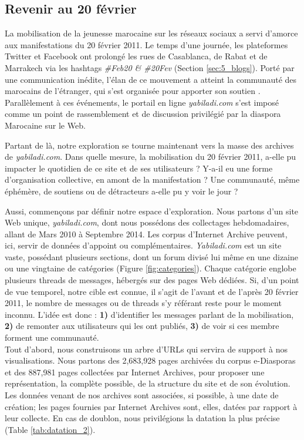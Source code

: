 \documentclass[symmetric,justified,marginals=raggedouter]{tufte-book}
\begin{document}
\subsection{Revenir au 20 février}

\noindent La mobilisation de la jeunesse marocaine sur les réseaux sociaux a servi d'amorce aux manifestations du 20 février 2011. Le temps d'une journée, les plateformes Twitter et Facebook ont prolongé les rues de Casablanca, de Rabat et de Marrakech via les hashtags \textit{\#Feb20 \& \#20Fev} (Section \ref{sec:5_blogs}). Porté par une communication inédite, l'élan de ce mouvement a atteint la communauté des marocains de l'étranger, qui s'est orga\-nisée pour apporter son soutien \citep{desrues_mouvement_2012}. Parallèlement à ces événements, le portail en ligne \textit{yabiladi.com} s'est imposé comme un point de rassemblement et de discussion privilégié par la diaspora Marocaine sur le Web. 

Partant de là, notre exploration se tourne maintenant vers la masse des archives de \textit{yabiladi.com}. Dans quelle mesure, la mobilisation du 20 février 2011, a-elle pu impacter le quotidien de ce site et de ses utilisateurs ? Y-a-il eu une forme d'organisation collective, en amont de la manifestation ? Une communauté, même éphémère, de soutiens ou de détracteurs a-elle pu y voir le jour ?

Aussi, commençons par définir notre espace d'exploration. Nous partons d'un site Web unique, \textit{yabiladi.com}, dont nous possédons des collectages hebdomadaires, allant de Mars 2010 à Septembre 2014. Les corpus d'Internet Archive peuvent, ici, servir de données d'appoint ou complémentaires. \textit{Yabiladi.com} est un site vaste, possédant plusieurs sections, dont un forum divisé lui même en une dizaine ou une vingtaine de catégories (Figure \ref{fig:categories}). Chaque catégorie englobe plusieurs threads de messages, hébergés sur des pages Web dédiées. Si, d'un point de vue temporel, notre cible est connue, il s'agit de l'avant et de l'après 20 février 2011, le nombre de messages ou de threads s'y référant reste pour le moment inconnu. L'idée est donc : \textbf{1)} d'identifier les messages parlant de la mobilisation, \textbf{2)} de remonter aux utilisateurs qui les ont publiés, \textbf{3)} de voir si ces membre forment une communauté. \\   

\noindent Tout d'abord, nous construisons un arbre d'URLs qui servira de support à nos visualisations. Nous partons des 2,683,928 pages archivées du corpus e-Diasporas et des 887,981 pages collectées par Internet Archives, pour proposer une représentation, la complète possible, de la structure du site et de son évolution. Les données venant de nos archives sont associées, si possible, à une date de création; les pages fournies par Internet Archives sont, elles, datées par rapport à leur collecte. En cas de doublon, nous privilégions la datation la plus précise (Table \ref{tab:datation_2}).
\end{document}
